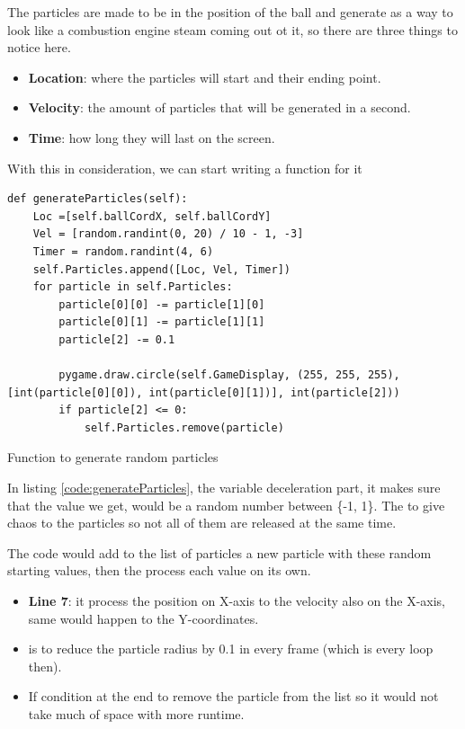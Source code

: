 The particles are made to be in the position of the ball and generate as a way to look like a combustion engine steam coming out ot it, so there are three things to notice here.
\begin{itemize}
\item \textbf{Location}: where the particles will start and their ending point.
\item \textbf{Velocity}: the amount of particles that will be generated in a second.
\item \textbf{Time}: how long they will last on the screen.
\end{itemize}

With this in consideration, we can start writing a function for it 

\begin{listing}[H]
	\begin{verbatim}
def generateParticles(self):
	Loc =[self.ballCordX, self.ballCordY] 
	Vel = [random.randint(0, 20) / 10 - 1, -3]
	Timer = random.randint(4, 6)
	self.Particles.append([Loc, Vel, Timer])
	for particle in self.Particles:
		particle[0][0] -= particle[1][0]
		particle[0][1] -= particle[1][1]
		particle[2] -= 0.1
		
		pygame.draw.circle(self.GameDisplay, (255, 255, 255), [int(particle[0][0]), int(particle[0][1])], int(particle[2]))
		if particle[2] <= 0:
			self.Particles.remove(particle)
	\end{verbatim}
\caption{Function to generate random particles}
\label{code:generateParticles}
\end{listing}

In listing \ref{code:generateParticles}, the  variable deceleration part, it makes sure that the value we get, would be a random number between \{-1, 1\}. The  to give chaos to the particles so not all of them are released at the same time.

The code would add to the list of particles a new particle with these random starting values, then the  process each value on its own.

\begin{itemize}
\item \textbf{Line 7}: it process the position on X-axis to the velocity also on the X-axis, same would happen to the Y-coordinates.
\item {} is to reduce the particle radius by 0.1 in every frame (which is every loop then).
\item If condition at the end to remove the particle from the list so it would not take much of space with more runtime.
\end{itemize}


